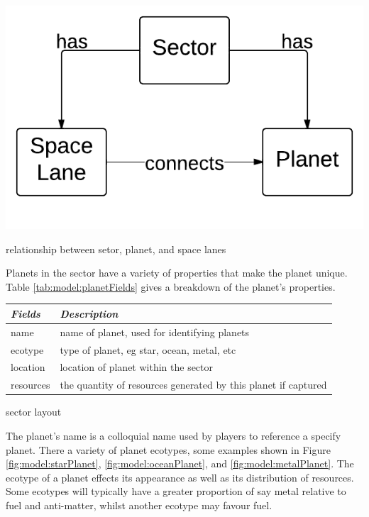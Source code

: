 \begin{marginfigure}
	\includegraphics{res/model/sector.pdf}
	\caption{relationship between setor, planet, and space lanes}
	\label{fig:model:sectorRelation}
\end{marginfigure}

Planets in the sector have a variety of properties that make the planet unique.
Table \ref{tab:model:planetFields} gives a breakdown of the planet's properties.

\begin{margintable}
    \begin{tabular}{p{3em} p{9em}}
    \toprule
    \emph{Fields} & \emph{Description} \\
    \midrule
    name & name of planet, used for identifying planets \\
    ecotype & type of planet, eg star, ocean, metal, etc \\
    location & location of planet within the sector \\
    resources & the quantity of resources generated by this planet if captured\\
    \bottomrule
    \end{tabular}
    	\vspace{1em}
	\caption{sector layout}
	\label{tab:model:planetFields}
\end{margintable}

The planet's name is a colloquial name used by players to reference a specify planet.
There a variety of planet ecotypes, some examples shown in Figure \ref{fig:model:starPlanet}, \ref{fig:model:oceanPlanet}, and \ref{fig:model:metalPlanet}.
The ecotype of a planet effects its appearance as well as its distribution of resources.
Some ecotypes will typically have a greater proportion of say metal relative to fuel and anti-matter, whilst another ecotype may favour fuel.

